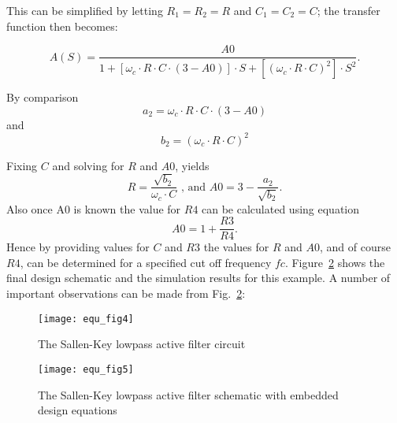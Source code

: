 This can be simplified by letting $R_{1}=R_{2}=R$ and $C_{1}=C_{2}=C$;
the transfer function then becomes:

\begin{equation}
A(S)=\dfrac{A0}{1+\left[ \omega_{c}\cdot R\cdot C\cdot\left(3-A0\right)\right]\cdot S+\left[ \left(\omega_{c}\cdot R\cdot C\right)^{2}\right]\cdot S^{2}}.\end{equation}

By comparison  
\begin{equation}
a_{2}=\omega_{c}\cdot R\cdot C\cdot \left(3-A0\right)
\end{equation}
 and  
\begin{equation}
b_{2}=\left(\omega_{c}\cdot R\cdot C\right)^{2}
\end{equation}

Fixing $C$ and solving for $R$ and $A0$, yields
\begin{equation}
R=\dfrac{\sqrt{b_{2}}}{\omega_{c}\cdot C}
\textrm{ , and }
A0=3-\dfrac{a_{2}}{\sqrt{b_{2}}}.
\end{equation}
Also once A0 is known the value for $R4$ can be calculated using
equation
\begin{equation}
A0=1+\dfrac{R3}{R4}.
\end{equation}
Hence by providing values for $C$ and $R3$ the values for $R$ and
$A0$, and of course $R4$, can be determined for a specified cut off
frequency $fc$. Figure~\ref{fig:equ_5} shows the final design
schematic and the simulation results for this example. A number of
important observations can be made from Fig.~\ref{fig:equ_5}:

\begin{figure}
  \centering
  \texttt{[image: equ\_fig4]}
  \caption{The Sallen-Key lowpass active filter circuit}
  \label{fig:equ_4}
\end{figure} 

\begin{figure}
  \centering
  \texttt{[image: equ\_fig5]}
  \caption{The Sallen-Key lowpass active filter schematic with embedded design equations}
  \label{fig:equ_5}
\end{figure} 
 
